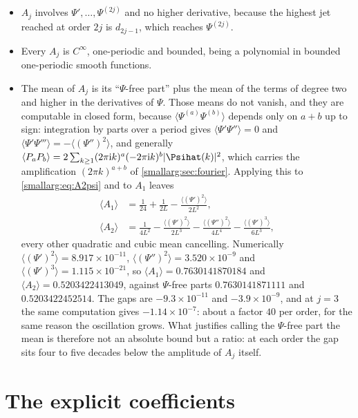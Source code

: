\documentclass[11pt,oneside]{article}
\theoremstyle{definition}
\theoremstyle{remark}
\newcommand{\ii}{\mathrm i}
\begin{document}
\begin{itemize}
\item $A_j$ involves $\Psi',\dots,\Psi^{(2j)}$ and no higher derivative,
  because the highest jet reached at order $2j$ is $d_{2j-1}$, which reaches
  $\Psi^{(2j)}$.
\item Every $A_j$ is $C^\infty$, one-periodic and bounded, being a polynomial
  in bounded one-periodic smooth functions.
\item The mean of $A_j$ is its ``$\Psi$-free part'' plus the mean of the
  terms of degree two and higher in the derivatives of $\Psi$.  Those means
  do not vanish, and they are computable in closed form, because
  $\langle\Psi^{(a)}\Psi^{(b)}\rangle$ depends only on $a+b$ up to sign:
  integration by parts over a period gives
  $\langle\Psi'\Psi''\rangle=0$ and
  $\langle\Psi'\Psi'''\rangle=-\langle(\Psi'')^2\rangle$, and generally
  $\langle P_aP_b\rangle=2\sum_{k\ge1}(2\pi\ii k)^a(-2\pi\ii k)^b|\Psihat(k)|^2$,
  which carries the amplification $(2\pi k)^{a+b}$ of \cref{smallarg:sec:fourier}.
  Applying this to \cref{smallarg:eq:A2psi} and to $A_1$ leaves
  \begin{align*}
    \langle A_1\rangle&=\frac1{24}+\frac1{2L}
      -\frac{\langle(\Psi')^2\rangle}{2L^2},\\
    \langle A_2\rangle&=\frac1{4L^2}
      -\frac{\langle(\Psi')^2\rangle}{2L^3}
      -\frac{\langle(\Psi'')^2\rangle}{4L^4}
      -\frac{\langle(\Psi')^3\rangle}{6L^3},
  \end{align*}
  every other quadratic and cubic mean cancelling.  Numerically
  $\langle(\Psi')^2\rangle=8.917\times10^{-11}$,
  $\langle(\Psi'')^2\rangle=3.520\times10^{-9}$ and
  $\langle(\Psi')^3\rangle=1.115\times10^{-21}$, so
  $\langle A_1\rangle=0.7630141870184$ and
  $\langle A_2\rangle=0.5203422413049$, against $\Psi$-free parts
  $0.7630141871111$ and $0.5203422452514$.  The gaps are
  $-9.3\times10^{-11}$ and $-3.9\times10^{-9}$, and at $j=3$ the same
  computation gives $-1.14\times10^{-7}$: about a factor $40$ per order,
  for the same reason the oscillation grows.  What justifies calling the
  $\Psi$-free part the mean is therefore not an absolute bound but a ratio:
  at each order the gap sits four to five decades below the amplitude of
  $A_j$ itself.
\end{itemize}

\section{The explicit coefficients}\label{smallarg:sec:explicit}
\end{document}
